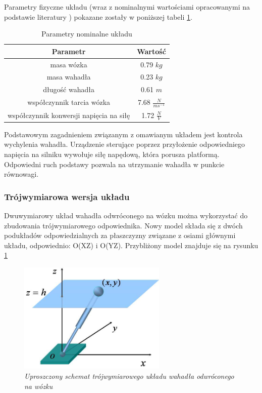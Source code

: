 \documentclass[12pt, oneside]{report}
\theoremstyle{definition}
\begin{document}
Parametry fizyczne układu (wraz z nominalnymi wartościami opracowanymi na podstawie literatury \cite{LMIP}) pokazane zostały w poniższej tabeli \ref{table:NominalParameters}.
\begin{table}[H]
\begin{center}
\begin{tabular}{|c|c|}
  \hline 
  Parametr & Wartość\\
  \hline
  masa wózka & 0.79 \(kg\) \\
  \hline
  masa wahadła & 0.23 \(kg\) \\
  \hline
  długość wahadła & 0.61 \(m\) \\
  \hline
  współczynnik tarcia wózka & 7.68 \(\frac{N}{ms^{-1}}\) \\
  \hline
  współczynnik konwersji napięcia na siłę & 1.72 \(\frac{N}{V}\) \\
  \hline
\end{tabular} 
\end{center}
\caption{Parametry nominalne układu}
\label{table:NominalParameters}
\end{table}

Podstawowym zagadnieniem związanym z omawianym układem jest kontrola wychylenia wahadła. Urządzenie sterujące poprzez przyłożenie odpowiedniego napięcia na silniku wywołuje siłę napędową, która porusza platformą. Odpowiedni ruch podstawy pozwala na utrzymanie wahadła w punkcie równowagi.

\subsubsection{Trójwymiarowa wersja układu}
Dwuwymiarowy układ wahadła odwróconego na wózku można wykorzystać do zbudowania trójwymiarowego odpowiednika. Nowy model składa się z dwóch podukładów odpowiedzialnych za płaszczyzny związane z osiami głównymi układu, odpowiednio: O(XZ) i O(YZ). Przybliżony model znajduje się na rysunku \ref{3DimModel}

\begin{figure}[H]
	\centering
		\includegraphics[width = 200pt]{3DimModel} 
		\caption{\textit{Uproszczony schemat trójwymiarowego układu wahadła odwróconego na wózku \cite{3DimModel}}}
		\label{3DimModel}
\end{figure}
\end{document}
